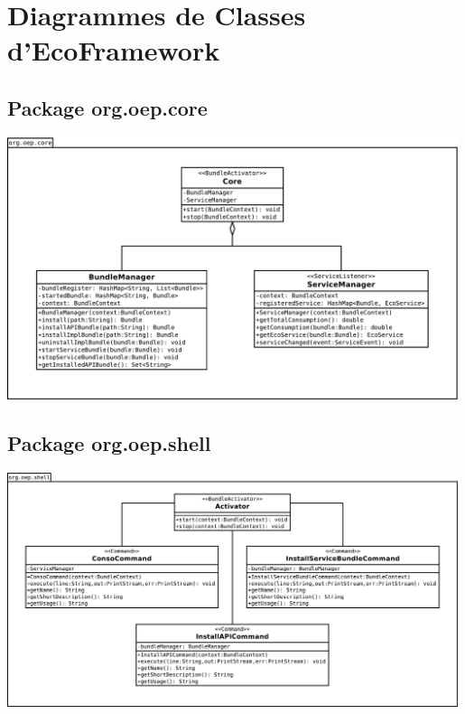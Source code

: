 \documentclass[a4paper, 11pt]{report}
\begin{document}
\chapter{Diagrammes de Classes d'EcoFramework}
\section{Package org.oep.core}
	\begin{centering}
		\includegraphics[width=0.99\textwidth]{figures/EcoPattern_Core_Classes}
	\end{centering}
\section{Package org.oep.shell}
	\begin{centering}
		\includegraphics[width=0.99\textwidth]{figures/EcoPattern_Shell_Classes}
	\end{centering}
\end{document}
